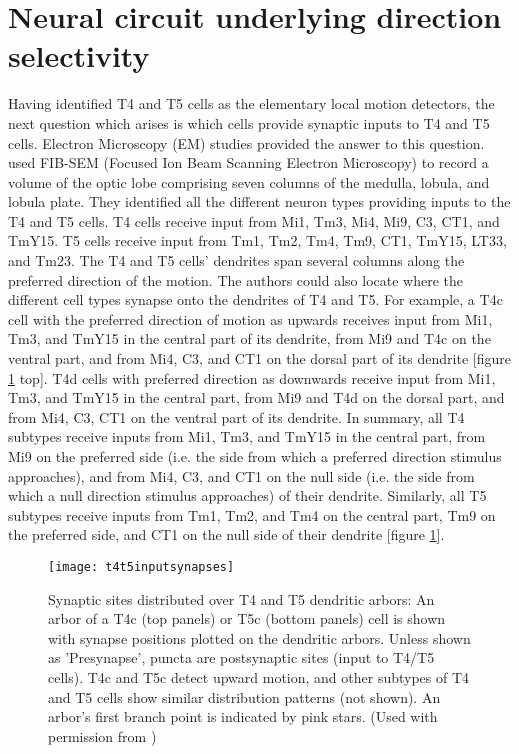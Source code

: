 \section{Neural circuit underlying direction selectivity}
Having identified T4 and T5 cells as the elementary local motion detectors, the next question which arises is which cells provide synaptic inputs to T4 and T5 cells. Electron Microscopy (EM) studies \parencite{Shinomiya2019, Takemura2017} provided the answer to this question. \cite{Shinomiya2019} used FIB-SEM (Focused Ion Beam Scanning Electron Microscopy) to record a volume of the optic lobe comprising seven columns of the medulla, lobula, and lobula plate. They identified all the different neuron types providing inputs to the T4 and T5 cells. T4 cells receive input from Mi1, Tm3, Mi4, Mi9, C3, CT1, and TmY15. T5 cells receive input from Tm1, Tm2, Tm4, Tm9, CT1, TmY15, LT33, and Tm23. The T4 and T5 cells' dendrites span several columns along the preferred direction of the motion. The authors could also locate where the different cell types synapse onto the dendrites of T4 and T5. For example, a T4c cell with the preferred direction of motion as upwards receives input from Mi1, Tm3, and TmY15 in the central part of its dendrite, from Mi9 and T4c on the ventral part, and from Mi4, C3, and CT1 on the dorsal part of its dendrite [figure \ref{fig:t4t5inputsynapses} top]. T4d cells with preferred direction as downwards receive input from Mi1, Tm3, and TmY15 in the central part, from Mi9 and T4d on the dorsal part, and from Mi4, C3, CT1 on the ventral part of its dendrite. In summary, all T4 subtypes receive inputs from Mi1, Tm3, and TmY15 in the central part, from Mi9 on the preferred side (i.e. the side from which a preferred direction stimulus approaches), and from Mi4, C3, and CT1 on the null side (i.e. the side from which a null direction stimulus approaches) of their dendrite. Similarly, all T5 subtypes receive inputs from Tm1, Tm2, and Tm4 on the central part, Tm9 on the preferred side, and CT1 on the null side of their dendrite [figure \ref{fig:t4t5inputsynapses}]. %

\begin{figure}
\centering
\hspace*{-1.4cm} 
\texttt{[image: t4t5inputsynapses]}
\caption[Synaptic sites distributed over T4 and T5 dendritic arbors]{Synaptic sites distributed over T4 and T5 dendritic arbors: An arbor of a T4c (top panels) or T5c (bottom panels) cell is shown with synapse positions plotted on the dendritic arbors. Unless shown as 'Presynapse', puncta are postsynaptic sites (input to T4/T5 cells). T4c and T5c detect upward motion, and other subtypes of T4 and T5 cells show similar distribution patterns (not shown). An arbor's first branch point is indicated by pink stars. (Used with permission from \cite{Shinomiya2019})}
\label{fig:t4t5inputsynapses}
\end{figure}

